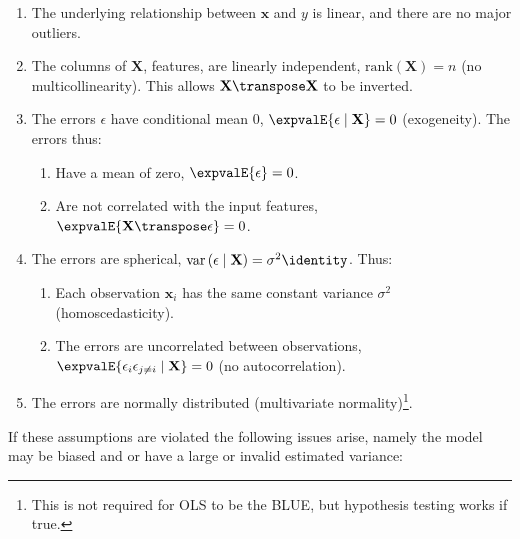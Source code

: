 \begin{enumerate}[noitemsep]
  \item The underlying relationship between $\mathbf{x}$ and $y$ is linear, and there are no major outliers.\label{item:regression:linear:linear}
  \item The columns of $\mathbf{X}$, \ie features, are linearly independent, \ie $\mathrm{rank}\left(\mathbf{X}\right) = n$ (no multicollinearity). This allows $\mathbf{X}\transpose\mathbf{X}$ to be inverted.\label{item:regression:linear:multicollinearity}
  \item The errors $\epsilon$ have conditional mean 0, $\expvalE{\epsilon \mid \mathbf{X}} = 0$ (exogeneity). The errors thus:\label{item:regression:linear:exogeneity}
  \begin{enumerate}[noitemsep]
    \item Have a mean of zero, $\expvalE{\epsilon} = 0$.
    \item Are not correlated with the input features, $\expvalE{\mathbf{X}\transpose\epsilon} = 0$.
  \end{enumerate}
  \item The errors are spherical, $\mathrm{var}\left(\epsilon \mid \mathbf{X}\right) = \sigma^{2} \identity$. Thus:\label{item:regression:linear:spherical}
  \begin{enumerate}[noitemsep]
    \item Each observation $\mathbf{x}_{i}$ has the same constant variance $\sigma^{2}$ (homoscedasticity).
    \item The errors are uncorrelated between observations, $\expvalE{\epsilon_{i}\epsilon_{j \neq i} \mid \mathbf{X}} = 0$ (no autocorrelation).
  \end{enumerate}
  \item The errors are normally distributed (multivariate normality)\footnote{This is not required for OLS to be the BLUE, but hypothesis testing works if true.}.\label{item:regression:linear:normality}
\end{enumerate}

If these assumptions are violated the following issues arise,
namely the model may be biased and or have a large or invalid estimated variance:

